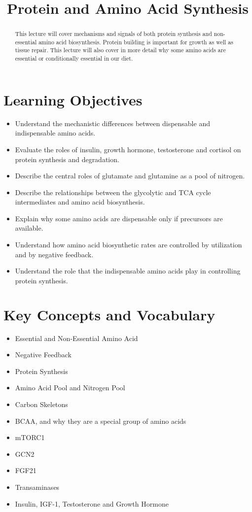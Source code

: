 \documentclass{tufte-handout}
\title{Protein and Amino Acid Synthesis}
\author{}
\date{}  %
\begin{document}
\maketitle%

\begin{abstract}
\noindent This lecture will cover mechanisms and signals of both protein synthesis and non-essential amino acid biosynthesis.  Protein building is important for growth as well as tissue repair.  This lecture will also cover in more detail why some amino acids are essential or conditionally essential in our diet.
\end{abstract}

\tableofcontents

\pagebreak{}
\section{Learning Objectives}

\begin{itemize}
\item Understand the mechanistic differences between dispensable and indispensable amino acids.
\item Evaluate the roles of insulin, growth hormone, testosterone and cortisol on protein synthesis and degradation.
\item Describe the central roles of glutamate and glutamine as a pool of nitrogen.
\item Describe the relationships between the glycolytic and TCA cycle intermediates and amino acid biosynthesis.
\item Explain why some amino acids are dispensable only if precursors are available.
\item Understand how amino acid biosynthetic rates are controlled by utilization and by negative feedback.
\item Understand the role that the indispensable amino acids play in controlling protein synthesis.
\end{itemize}

\section{Key Concepts and Vocabulary}
\begin{itemize}
	\item Essential and Non-Essential Amino Acid
	\item Negative Feedback
	\item Protein Synthesis
	\item Amino Acid Pool and Nitrogen Pool
	\item Carbon Skeletons
	\item BCAA, and why they are a special group of amino acids
	\item mTORC1 
	\item GCN2
	\item FGF21
	\item Transaminases
	\item Insulin, IGF-1, Testosterone and Growth Hormone
\end{itemize}
\end{document}
